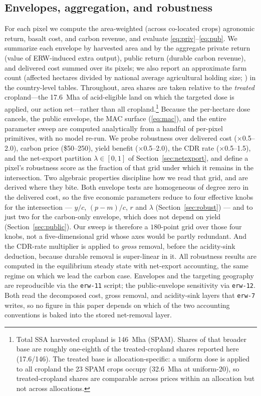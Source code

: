 \documentclass[12pt]{article}
\begin{document}
\subsection{Envelopes, aggregation, and robustness}
For each pixel we compute the area-weighted (across co-located crops) agronomic
return, basalt cost, and carbon revenue, and evaluate
\eqref{eq:priv}--\eqref{eq:pub}. We summarize each envelope by harvested area and
by the aggregate private return (value of ERW-induced extra output), public
return (durable carbon revenue), and delivered cost summed over its pixels; we
also report an approximate farm count (affected hectares divided by national
average agricultural holding size; \citealp{lowder2016}) in the country-level
tables. Throughout, area shares are taken relative to the \emph{treated}
cropland---the 17.6~Mha of acid-eligible land on which the targeted dose is
applied, our action set---rather than all cropland.\footnote{Total SSA harvested
cropland is 146~Mha (SPAM). Shares of that broader base are roughly one-eighth of
the treated-cropland shares reported here (17.6/146). The treated base is
allocation-specific: a uniform dose is applied to all cropland the 23 SPAM crops
occupy (32.6~Mha at uniform-20), so treated-cropland shares are comparable across
prices within an allocation but not across allocations.} Because the per-hectare
dose cancels, the public envelope, the MAC surface (\eqref{eq:mac}), and the entire
parameter sweep are computed analytically from a handful of per-pixel primitives,
with no model re-run. We probe robustness over delivered cost ($\times$0.5--2.0),
carbon price (\$50--250), yield benefit ($\times$0.5--2.0), the CDR rate
($\times$0.5--1.5), and the net-export partition $\lambda\in[0,1]$ of
Section~\ref{sec:netexport}, and define a pixel's robustness score as the fraction
of that grid under which it remains in the intersection. Two algebraic properties
discipline how we read that grid, and are derived where they bite. Both envelope
tests are homogeneous of degree zero in the delivered cost, so the five economic
parameters reduce to four effective knobs for the intersection --- $y/c$,
$(p-m)/c$, $r$ and $\lambda$ (Section~\ref{sec:robust}) --- and to just two for the
carbon-only envelope, which does not depend on yield (Section~\ref{sec:public}).
Our sweep is therefore a $180$-point grid over those four knobs, not a
five-dimensional grid whose axes would be partly redundant. And the CDR-rate
multiplier is applied to \emph{gross} removal, before the acidity-sink deduction,
because durable removal is super-linear in it. All robustness results are computed
in the equilibrium steady state with net-export accounting, the same regime on
which we lead the carbon case. Envelopes and the targeting geography are
reproducible via the \texttt{erw-11} script; the public-envelope sensitivity via
\texttt{erw-12}. Both read the decomposed cost, gross removal, and acidity-sink
layers that \texttt{erw-7} writes, so no figure in this paper depends on which of
the two accounting conventions is baked into the stored net-removal layer.
\end{document}
